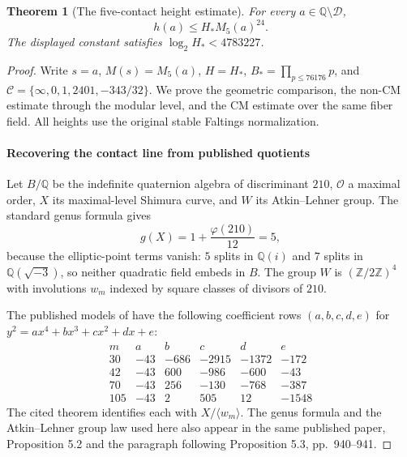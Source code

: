 \documentclass[11pt]{article}
\newtheorem{theorem}{Theorem}[section]
\theoremstyle{definition}
\theoremstyle{remark}
\newcommand{\Q}{\mathbb Q}
\begin{document}
\begin{theorem}[The five-contact height estimate]\label{hyp:o8-height}
For every $a\in\Q\setminus\mathcal D$,
\[
 h(a)\le H_*M_5(a)^{24}.
\]
The displayed constant satisfies $\log_2H_*<4783227$.
\end{theorem}
\begin{proof}
Write $s=a$, $M(s)=M_5(a)$, $H=H_*$,
$B_*=\prod_{p\le76176}p$, and
$\mathcal C=\{\infty,0,1,2401,-343/32\}$.
We prove the geometric comparison, the non-CM estimate through the
modular level, and the CM estimate over the same fiber field.
All heights use the original stable Faltings normalization.
\paragraph{Recovering the contact line from published quotients}
Let $B/\mathbb Q$ be the indefinite quaternion algebra of discriminant $210$,
$\mathcal O$ a maximal order, $X$ its maximal-level Shimura curve, and $W$
its Atkin--Lehner group. The standard genus formula gives
\[
 g(X)=1+\frac{\varphi(210)}{12}=5,
\]
because the elliptic-point terms vanish: $5$ splits in $\mathbb Q(i)$ and
$7$ splits in $\mathbb Q(\sqrt{-3})$, so neither quadratic field embeds in
$B$. The group $W$ is $(\mathbb Z/2\mathbb Z)^4$ with involutions $w_m$
indexed by square classes of divisors of $210$.

The published models of \cite[Theorem 4.2 and Table 2, pp.~938--939]{GonzalezRotger2006} have the following coefficient rows
$(a,b,c,d,e)$ for $y^2=ax^4+bx^3+cx^2+dx+e$:
\[
\begin{array}{c|rrrrr}
 m&a&b&c&d&e\\\hline
30&-43&-686&-2915&-1372&-172\\
42&-43&600&-986&-600&-43\\
70&-43&256&-130&-768&-387\\
105&-43&2&505&12&-1548
\end{array}
\]
The cited theorem identifies each with $X/\langle w_m\rangle$.
The genus formula and the Atkin--Lehner group law used here also appear
in the same published paper, Proposition 5.2 and the paragraph following
Proposition 5.3, pp.~940--941.


\end{proof}
\end{document}
